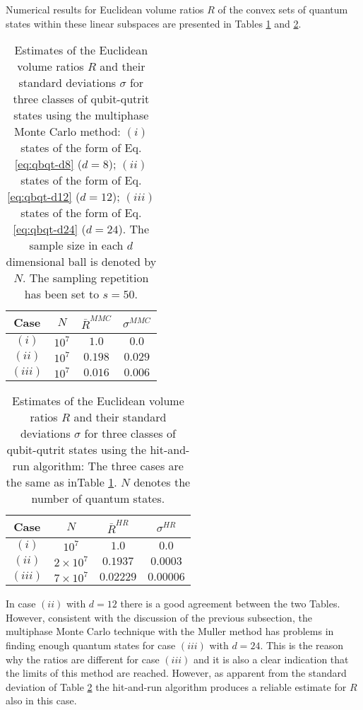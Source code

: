 \documentclass[12pt]{iopart}
\begin{document}
Numerical results for Euclidean volume ratios $R$  of the convex sets of quantum states within these linear subspaces are presented in Tables \ref{tab:qbqt} and \ref{tab:qbqtHR}.
\begin{table}[H]
  \centering
\begin{tabular}{ |c|c|c|c| }
\hline
Case & $N$ &  $\bar{R}^{MMC}$  & $\sigma^{MMC}$ \\
\hline
$(i)$ & $10^7$ &  $1.0$ & $0.0$\\
$(ii)$  &$10^7$ & $0.198$ & $0.029$ \\
$(iii)$ & $10^7$ & $0.016$  & $0.006$ \\
\hline
\end{tabular}
\caption{
Estimates of  the Euclidean volume ratios $R$ and their standard deviations $\sigma$ for three classes of qubit-qutrit states using the multiphase Monte Carlo method: 
$(i)$ states of the form of Eq. \eqref{eq:qbqt-d8} ($d=8$);
$(ii)$ states of the form of Eq.\eqref{eq:qbqt-d12} ($d=12$); $(iii)$ states of the form of Eq. \eqref{eq:qbqt-d24} ($d=24$). The sample size in each $d$ dimensional ball is denoted by $N$. The sampling repetition 
has been set to $s=50$.}
\label{tab:qbqt}
\end{table}
\begin{table}[H]
  \centering
\begin{tabular}{ |c|c|c|c| }
\hline
Case & $N$ &  $\bar{R}^{HR}$  & $\sigma^{HR}$ \\
\hline
$(i)$ & $10^7$ &  $1.0$ & $0.0$\\
$(ii)$  &$2\times 10^7$ & $0.1937$ & $0.0003$ \\
$(iii)$ & $7 \times 10^7$ & $0.02229$  & $0.00006$ \\
\hline
\end{tabular}
\caption{
Estimates of the Euclidean volume ratios $R$ and their standard deviations $\sigma$ for three classes of qubit-qutrit states using the hit-and-run algorithm: 
The three cases are the same as inTable \ref{tab:qbqt}. $N$ denotes the number of quantum states.}
\label{tab:qbqtHR}
\end{table}
In case $(ii)$ with $d=12$ there is a good agreement between the two Tables. However, consistent with the discussion of the previous subsection, the multiphase Monte Carlo technique with the Muller method 
has problems in finding enough quantum states for case $(iii)$ with $d=24$. This is the reason why the ratios are different for case $(iii)$ 
and it is also a clear indication that the limits of this method are reached. However, as apparent from the standard deviation of Table  \ref{tab:qbqtHR}  the hit-and-run algorithm produces  a reliable estimate for $R$ also in this case.
\end{document}
